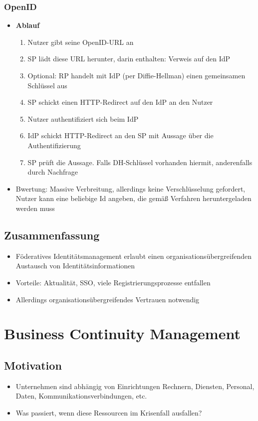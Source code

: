 \subsubsection{OpenID}
\begin{itemize}
	\item \textbf{Ablauf}
	\begin{enumerate}
		\item Nutzer gibt seine OpenID-URL an
		\item SP lädt diese URL herunter, darin enthalten: Verweis auf den IdP
		\item Optional: RP handelt mit IdP (per Diffie-Hellman) einen gemeinsamen Schlüssel aus
		\item SP schickt einen HTTP-Redirect auf den IdP an den Nutzer
		\item Nutzer authentifiziert sich beim IdP
		\item IdP schickt HTTP-Redirect an den SP mit Aussage über die Authentifizierung
		\item SP prüft die Aussage. Falls DH-Schlüssel vorhanden hiermit, anderenfalls durch Nachfrage
	\end{enumerate}
	\item Bwertung: Massive Verbreitung, allerdings keine Verschlüsselung gefordert, Nutzer kann eine beliebige Id angeben, die gemäß Verfahren heruntergeladen werden muss
\end{itemize}


\subsection{Zusammenfassung}
\begin{itemize}
	\item Föderatives Identitätsmanagement erlaubt einen organisationsübergreifenden Austausch von Identitätsinformationen
	\item Vorteile: Aktualität, SSO, viele Registrierungsprozesse entfallen
	\item Allerdings organisationsübergreifendes Vertrauen notwendig
\end{itemize}



\section{Business Continuity Management}

\subsection{Motivation}
\begin{itemize}
	\item Unternehmen sind abhängig von Einrichtungen Rechnern, Diensten, Personal, Daten, Kommunikationsverbindungen, etc.
	\item Was passiert, wenn diese Ressourcen im Krisenfall ausfallen?
\end{itemize}


